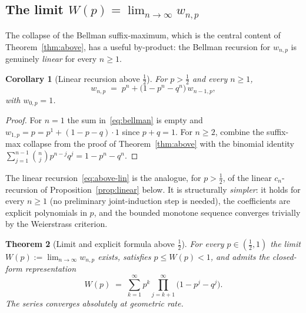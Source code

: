 \documentclass[12pt]{article}
\newtheorem{theorem}{Theorem}[section]
\newtheorem{corollary}[theorem]{Corollary}
\theoremstyle{definition}
\theoremstyle{remark}
\begin{document}
\subsection{The limit \texorpdfstring{$W(p)=\lim_{n\to\infty}w_{n,p}$}{W(p) = lim w(n,p)}}\label{sec:above-limit}

The collapse of the Bellman suffix-maximum, which is the central
content of Theorem~\ref{thm:above}, has a useful by-product: the
Bellman recursion for $w_{n,p}$ is genuinely \emph{linear} for
every $n\ge 1$.

\begin{corollary}[Linear recursion above $\tfrac12$]\label{cor:above-lin}
  For $p>\tfrac12$ and every $n\ge 1$,
  \begin{equation}\label{eq:above-lin}
    w_{n,p} \;=\; p^n + \bigl(1-p^n-q^n\bigr)\,w_{n-1,p},
  \end{equation}
  with $w_{0,p}=1$.
\end{corollary}

\begin{proof}
  For $n=1$ the sum in~\eqref{eq:bellman} is empty and
  $w_{1,p}=p=p^1+(1-p-q)\cdot 1$ since $p+q=1$.  For $n\ge 2$,
  combine the suffix-max collapse from the proof of
  Theorem~\ref{thm:above} with the binomial identity
  $\sum_{j=1}^{n-1}\binom{n}{j}p^{n-j}q^j=1-p^n-q^n$.
\end{proof}

The linear recursion~\eqref{eq:above-lin} is the analogue, for
$p>\tfrac12$, of the linear $c_n$-recursion of
Proposition~\ref{prop:linear} below.  It is structurally
\emph{simpler}: it holds for every $n\ge 1$ (no preliminary
joint-induction step is needed), the coefficients are explicit
polynomials in $p$, and the bounded monotone sequence converges
trivially by the Weierstrass criterion.

\begin{theorem}[Limit and explicit formula above $\tfrac12$]
  \label{thm:above-limit}
  For every $p\in(\tfrac12,1)$ the limit
  $W(p):=\lim_{n\to\infty}w_{n,p}$ exists, satisfies
  $p\le W(p)<1$, and admits the closed-form representation
  \begin{equation}\label{eq:above-W-formula}
    W(p) \;=\; \sum_{k=1}^\infty p^k\!\!\!\prod_{j=k+1}^\infty\!\!
            \bigl(1-p^j-q^j\bigr).
  \end{equation}
  The series converges absolutely at geometric rate.
\end{theorem}
\end{document}

